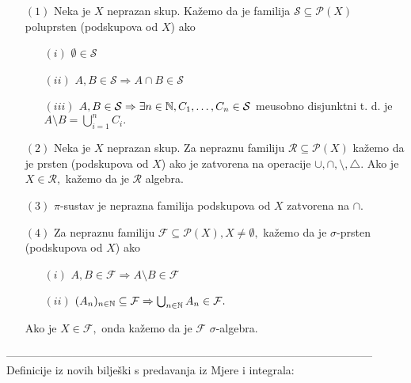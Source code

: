 \documentclass{article}
\begin{document}
\begin{enumerate}
    \item[\((1)\)] Neka je \(X\) neprazan skup. Kažemo da je familija \(\mathcal S\subseteq\mathcal P(X)\) poluprsten (podskupova od \(X\)) ako\begin{itemize}
        \item[\((i)\)] \(\emptyset\in\mathcal S\)
        \item[\((ii)\)] \(A,B\in\mathcal S\Rightarrow A\cap B\in\mathcal S\)
        \item[\((iii)\)] \(A,B\in\mathcal S\Rightarrow\exists n\in\Bbb N,C_1,\ldots, C_n\in\mathcal S\) me\dj{}usobno disjunktni t. d. je \(A\setminus B=\bigcup_{i=1}^nC_i.\)
    \end{itemize}
    \item[\((2)\)] Neka je \(X\) neprazan skup. Za nepraznu familiju \(\mathcal R\subseteq\mathcal P(X)\) kažemo da je prsten (podskupova od \(X\)) ako je zatvorena na operacije \(\cup,\cap,\setminus,\triangle.\) Ako je \(X\in\mathcal R,\) kažemo da je \(\mathcal R\) algebra.
    \item[\((3)\)] \(\pi\)-sustav je neprazna familija podskupova od \(X\) zatvorena na \(\cap.\)
    \item[\((4)\)] Za nepraznu familiju \(\mathcal F\subseteq\mathcal P(X),X\ne\emptyset,\) kažemo da je \(\sigma\)-prsten (podskupova od \(X\)) ako \begin{itemize}
        \item[\((i)\)] \(A,B\in\mathcal F\Rightarrow A\setminus B\in\mathcal F\)
        \item[\((ii)\)] \((A_n)_{n\in\Bbb N}\subseteq\mathcal F\Rightarrow\bigcup_{n\in\Bbb N}A_n\in\mathcal F.\)
    \end{itemize} Ako je \(X\in\mathcal F,\) onda kažemo da je \(\mathcal F\) \(\sigma\)-algebra.
\end{enumerate}---------------------------------------------------------------------------------------------------\newline\newline
Definicije iz novih bilješki s predavanja iz Mjere i integrala:
\end{document}
